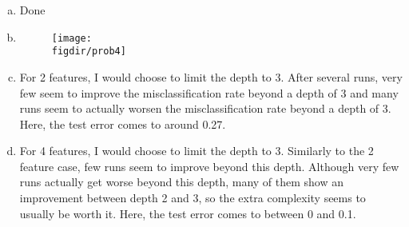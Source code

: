 \documentclass[twoside,11pt]{article}
\newcommand{\figdir}{figs}
\theoremstyle{definition}
\begin{document}
\begin{enumerate}[(a)]
	\item Done
	
	\item
		\begin{figure}[H] \centering
		\texttt{[image: \\figdir/prob4]} \\
		\end{figure}
		
	\item For 2 features, I would choose to limit the depth to 3.  After several runs, very few seem to improve the misclassification rate beyond a depth of 3 and many runs seem to actually worsen the misclassification rate beyond a depth of 3. Here, the test error comes to around 0.27.

	\item For 4 features, I would choose to limit the depth to 3.  Similarly to the 2 feature case, few runs seem to improve beyond this depth.
Although very few runs actually get worse beyond this depth, many of them show an improvement between depth 2 and 3, so the extra complexity seems to usually be worth it.  Here, the test error comes to between 0 and 0.1.

\end{enumerate}

\end{document}
